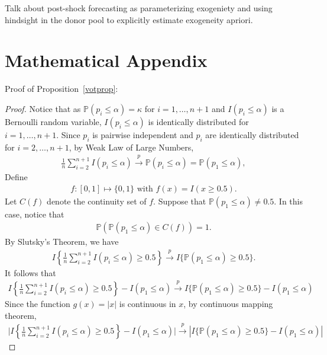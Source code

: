 \documentclass[11pt]{article}
\def\P{\mathbb{P}}
\theoremstyle{definition}
\begin{document}
Talk about post-shock forecasting as parameterizing exogeniety and using hindsight in the donor pool to explicitly estimate exogeneity apriori.



\section{Mathematical Appendix}


Proof of Proposition~\ref{votprop}:

\begin{proof}
Notice that as $\P(p_i \leq \alpha)=\kappa$ for $i = 1, \ldots, n+1$ and $I(p_i \leq  \alpha) $ is a Bernoulli random variable, $I(p_i \leq  \alpha)$ is identically distributed for  $i = 1, \ldots, n+1$. Since $p_i$ is pairwise independent and $p_i$ are identically distributed for $i = 2, \ldots, n+1$, by Weak Law of Large Numbers, 
\begin{align*}
  \frac{1}{n}\sum_{i=2}^{n+1}I(p_i \leq  \alpha)  
   \stackrel{p}{\rightarrow}  \P(p_i \leq \alpha) = \P(p_1 \leq \alpha),
\end{align*}
Define
\begin{align*}
  f \colon [0,1] \mapsto \{0,1\} 
  \text{ with }
  f(x) = I(x \geq 0.5).
\end{align*}
Let $C(f)$ denote the continuity set of $f$. Suppose that $\P(p_1 \leq  \alpha) \neq 0.5$. In this case, notice that 
\begin{align*}
  \P(\P(p_1 \leq  \alpha) \in C(f)) =1.
\end{align*}
By Slutsky's Theorem, we have
\begin{align*}
  I\left\{\frac{1}{n}\sum_{i=2}^{n+1}I(p_i \leq  \alpha) \geq 0.5\right\}
  \stackrel{p}{\rightarrow} 
  I\{ \P(p_1 \leq  \alpha) \geq 0.5\}.
\end{align*}
It follows that
\begin{align*}
   I\left\{\frac{1}{n}\sum_{i=2}^{n+1}I(p_i \leq  \alpha) \geq 0.5\right\}- I( p_1 \leq  \alpha) 
  \stackrel{p}{\rightarrow} 
  I\{ \P(p_1 \leq  \alpha) \geq 0.5\} - I( p_1 \leq  \alpha) 
\end{align*}
Since the function $g(x)= |x|$ is continuous in $x$,  by continuous mapping theorem, 
\begin{align*}
  \bigg|  I\left\{\frac{1}{n}\sum_{i=2}^{n+1}I(p_i \leq  \alpha) \geq 0.5\right\}
  - I( p_1 \leq  \alpha) \bigg| \stackrel{p}{\rightarrow}   |I\{ \P(p_1 \leq  \alpha) \geq 0.5\}
  - I( p_1 \leq  \alpha) |
\end{align*}

\end{proof}
\end{document}
